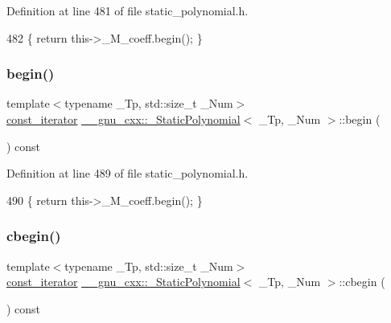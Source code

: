 Definition at line 481 of file static\+\_\+polynomial.\+h.


\begin{DoxyCode}
482       \{ \textcolor{keywordflow}{return} this->\_M\_coeff.begin(); \}
\end{DoxyCode}
\mbox{\label{class____gnu__cxx_1_1__StaticPolynomial_a1480651a5ed756cac1b14df6db353d7b}} 
\subsubsection{\texorpdfstring{begin()}{begin()}\hspace{0.1cm}{\footnotesize\ttfamily [2/2]}}
{\footnotesize\ttfamily template$<$typename \+\_\+\+Tp, std\+::size\+\_\+t \+\_\+\+Num$>$ \\
\hyperlink{class____gnu__cxx_1_1__StaticPolynomial_a6fac29559236e7576f7e35b03d35ee08}{const\+\_\+iterator} \hyperlink{class____gnu__cxx_1_1__StaticPolynomial}{\+\_\+\+\_\+gnu\+\_\+cxx\+::\+\_\+\+Static\+Polynomial}$<$ \+\_\+\+Tp, \+\_\+\+Num $>$\+::begin (\begin{DoxyParamCaption}{ }\end{DoxyParamCaption}) const\hspace{0.3cm}{\ttfamily [inline]}}



Definition at line 489 of file static\+\_\+polynomial.\+h.


\begin{DoxyCode}
490       \{ \textcolor{keywordflow}{return} this->\_M\_coeff.begin(); \}
\end{DoxyCode}
\mbox{\label{class____gnu__cxx_1_1__StaticPolynomial_a9a5b5392d0403ce5e57c1a41f9296741}} 
\subsubsection{\texorpdfstring{cbegin()}{cbegin()}}
{\footnotesize\ttfamily template$<$typename \+\_\+\+Tp, std\+::size\+\_\+t \+\_\+\+Num$>$ \\
\hyperlink{class____gnu__cxx_1_1__StaticPolynomial_a6fac29559236e7576f7e35b03d35ee08}{const\+\_\+iterator} \hyperlink{class____gnu__cxx_1_1__StaticPolynomial}{\+\_\+\+\_\+gnu\+\_\+cxx\+::\+\_\+\+Static\+Polynomial}$<$ \+\_\+\+Tp, \+\_\+\+Num $>$\+::cbegin (\begin{DoxyParamCaption}{ }\end{DoxyParamCaption}) const\hspace{0.3cm}{\ttfamily [inline]}}



